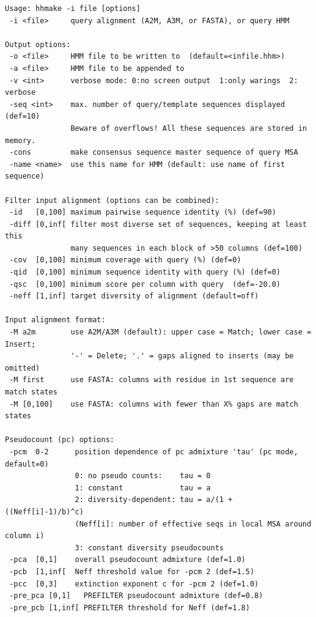 \documentclass[11pt,a4paper]{article}
\begin{document}
\small 
\begin{verbatim}
Usage: hhmake -i file [options]                                       
 -i <file>     query alignment (A2M, A3M, or FASTA), or query HMM         

Output options:                                                           
 -o <file>     HMM file to be written to  (default=<infile.hhm>)          
 -a <file>     HMM file to be appended to                                 
 -v <int>      verbose mode: 0:no screen output  1:only warings  2: verbose
 -seq <int>    max. number of query/template sequences displayed (def=10)  
               Beware of overflows! All these sequences are stored in memory.
 -cons         make consensus sequence master sequence of query MSA 
 -name <name>  use this name for HMM (default: use name of first sequence)   

Filter input alignment (options can be combined):                         
 -id   [0,100] maximum pairwise sequence identity (%) (def=90)   
 -diff [0,inf[ filter most diverse set of sequences, keeping at least this    
               many sequences in each block of >50 columns (def=100)
 -cov  [0,100] minimum coverage with query (%) (def=0) 
 -qid  [0,100] minimum sequence identity with query (%) (def=0) 
 -qsc  [0,100] minimum score per column with query  (def=-20.0)
 -neff [1,inf] target diversity of alignment (default=off)

Input alignment format:                                                    
 -M a2m        use A2M/A3M (default): upper case = Match; lower case = Insert;
               '-' = Delete; '.' = gaps aligned to inserts (may be omitted)   
 -M first      use FASTA: columns with residue in 1st sequence are match states
 -M [0,100]    use FASTA: columns with fewer than X% gaps are match states   

Pseudocount (pc) options:                                                        
 -pcm  0-2      position dependence of pc admixture 'tau' (pc mode, default=0) 
                0: no pseudo counts:    tau = 0                                  
                1: constant             tau = a                                  
                2: diversity-dependent: tau = a/(1 + ((Neff[i]-1)/b)^c)          
                (Neff[i]: number of effective seqs in local MSA around column i) 
                3: constant diversity pseudocounts                               
 -pca  [0,1]    overall pseudocount admixture (def=1.0)                        
 -pcb  [1,inf[  Neff threshold value for -pcm 2 (def=1.5)                      
 -pcc  [0,3]    extinction exponent c for -pcm 2 (def=1.0)                     
 -pre_pca [0,1]   PREFILTER pseudocount admixture (def=0.8)                    
 -pre_pcb [1,inf[ PREFILTER threshold for Neff (def=1.8)                       


\end{verbatim}
\end{document}
